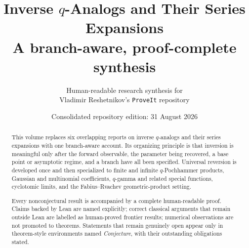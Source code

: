 \documentclass[11pt,oneside]{article}
\title{\bfseries Inverse \(q\)-Analogs and Their Series Expansions\\[0.35em]
\large A branch-aware, proof-complete synthesis}
\author{Human-readable research synthesis for\\
\small Vladimir Reshetnikov's \texttt{ProveIt} repository}
\date{Consolidated repository edition: 31 August 2026}
\theoremstyle{definition}
\theoremstyle{remark}
\begin{document}
\maketitle

\begin{abstract}
This volume replaces six overlapping reports on inverse \(q\)-analogs and
their series expansions with one branch-aware account.  Its organizing
principle is that inversion is meaningful only after the forward observable,
the parameter being recovered, a base point or asymptotic regime, and a branch
have all been specified.  Universal reversion is developed once and then
specialized to finite and infinite \(q\)-Pochhammer products, Gaussian and
multinomial coefficients, \(q\)-gamma and related special functions,
cyclotomic limits, and the Fabius--Rvachev geometric-product setting.

Every nonconjectural result is accompanied by a complete human-readable proof.
Claims backed by Lean are named explicitly; correct classical arguments that
remain outside Lean are labelled as human-proved frontier results; numerical
observations are not promoted to theorems.  Statements that remain genuinely
open appear only in theorem-style environments named \emph{Conjecture}, with
their outstanding obligations stated.
\end{abstract}

\tableofcontents
\clearpage










\end{document}
